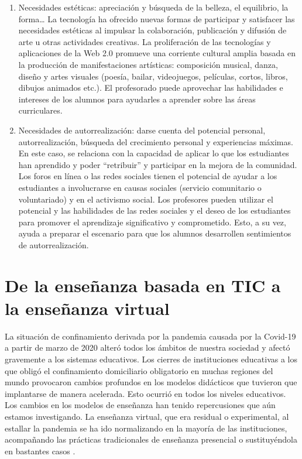 \documentclass[spanish]{textolivre}
\begin{document}
\begin{enumerate}
    \item Necesidades estéticas: apreciación y búsqueda de la belleza, el equilibrio, la forma… La tecnología ha ofrecido nuevas formas de participar y satisfacer las necesidades estéticas al impulsar la colaboración, publicación y difusión de arte u otras actividades creativas. La proliferación de las tecnologías y aplicaciones de la Web 2.0 promueve una corriente cultural amplia basada en la producción de manifestaciones artísticas: composición musical, danza, diseño y artes visuales (poesía, bailar, videojuegos, películas, cortos, libros, dibujos animados etc.). El profesorado puede aprovechar las habilidades e intereses de los alumnos para ayudarles a aprender sobre las áreas curriculares.
    \item Necesidades de autorrealización: darse cuenta del potencial personal, autorrealización, búsqueda del crecimiento personal y experiencias máximas. En este caso, se relaciona con la capacidad de aplicar lo que los estudiantes han aprendido y poder “retribuir” y participar en la mejora de la comunidad. Los foros en línea o las redes sociales tienen el potencial de ayudar a los estudiantes a involucrarse en causas sociales (servicio comunitario o voluntariado) y en el activismo social. Los profesores pueden utilizar el potencial y las habilidades de las redes sociales y el deseo de los estudiantes para promover el aprendizaje significativo y comprometido. Esto, a su vez, ayuda a preparar el escenario para que los alumnos desarrollen sentimientos de autorrealización.
\end{enumerate}

\section{De la enseñanza basada en TIC a la enseñanza virtual}\label{sec-organizacao}
La situación de confinamiento derivada por la pandemia causada por la Covid-19 a partir de marzo de 2020 alteró todos los ámbitos de nuestra sociedad y afectó gravemente a los sistemas educativos. Los cierres de instituciones educativas a los que obligó el confinamiento domiciliario obligatorio en muchas regiones del mundo provocaron cambios profundos en los modelos didácticos que tuvieron que implantarse de manera acelerada. Esto ocurrió en todos los niveles educativos. Los cambios en los modelos de enseñanza han tenido repercusiones que aún estamos investigando. La enseñanza virtual, que era residual o experimental, al estallar la pandemia se ha ido normalizando en la mayoría de las instituciones, acompañando las prácticas tradicionales de enseñanza presencial o sustituyéndola en bastantes casos \cite{fernandez_cruz_evaluation_2020}.
\end{document}
